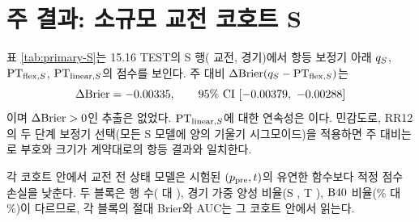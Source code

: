 \section{주 결과: 소규모 교전 코호트 S}
\label{sec:pred-primary-S}

표 \ref{tab:primary-S}는 15.16 TEST의 S 행(\numSTest{} 교전, \numSTestMatches{} 경기)에서 항등 보정기 아래 $q_{S}$, $\mathrm{PT}_{\mathrm{flex},S}$, $\mathrm{PT}_{\mathrm{linear},S}$의 점수를 보인다. 주 대비 $\Delta\mathrm{Brier}(q_{S} - \mathrm{PT}_{\mathrm{flex},S})$는
\begin{equation}
  \Delta\mathrm{Brier} = -0.00335, \qquad 95\%\ \text{CI}\ [-0.00379,\ -0.00288]
\end{equation}
이며 $\Delta\mathrm{Brier} > 0$인 추출은 없었다. $\mathrm{PT}_{\mathrm{linear},S}$에 대한 연속성은 \dBrierSlin{} \ci{\dBrierSlinLo}{\dBrierSlinHi}이다. 민감도로, RR12의 두 단계 보정기 선택(모든 S 모델에 양의 기울기 시그모이드)을 적용하면 주 대비는 \dBrierSsens{} \ci{\dBrierSsensLo}{\dBrierSsensHi}로 부호와 크기가 계약대로의 항등 결과와 일치한다.



각 코호트 안에서 교전 전 상태 모델은 시험된 $(p_{\mathrm{pre}}, t)$의 유연한 함수보다 적정 점수 손실을 낮춘다. 두 블록은 행 수(\numSTest{} 대 \numTTest), 경기 가중 양성 비율(S \posRateS, T \posRateT), $\mathrm{B40}$ 비율(\shareSBforty\% 대 \shareTBforty\%)이 다르므로, 각 블록의 절대 Brier와 AUC는 그 코호트 안에서 읽는다.

